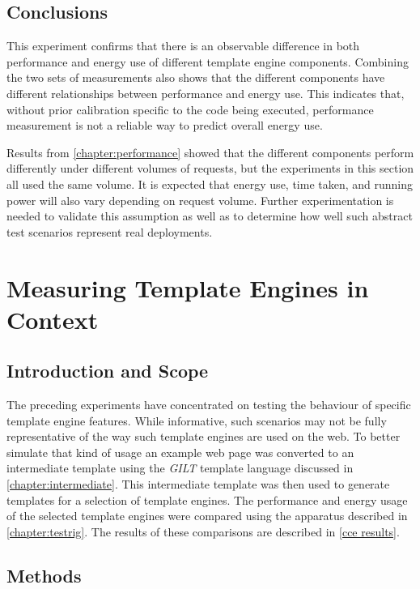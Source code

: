 \subsection{Conclusions}
\label{fse2 conclusions}

This experiment confirms that there is an observable difference in both performance and energy use of different template engine components. Combining the two sets of measurements also shows that the different components have different relationships between performance and energy use. This indicates that, without prior calibration specific to the code being executed, performance measurement is not a reliable way to predict overall energy use.

Results from \autoref{chapter:performance} showed that the different components perform differently under different volumes of requests, but the experiments in this section all used the same volume. It is expected that energy use, time taken, and running power will also vary depending on request volume.  Further experimentation is needed to validate this assumption as well as to determine how well such abstract test scenarios represent real deployments.

\section{Measuring Template Engines in Context}
\label{section:context energy}

\subsection{Introduction and Scope}
\label{cce intro}

The preceding experiments have concentrated on testing the behaviour of specific template engine features. While informative, such scenarios may not be fully representative of the way such template engines are used on the web. To better simulate that kind of usage an example web page was converted to an intermediate template using the \emph{GILT} template language discussed in \autoref{chapter:intermediate}. This intermediate template was then used to generate templates for a selection of template engines. The performance and energy usage of the selected template engines were compared using the apparatus described in \autoref{chapter:testrig}. The results of these comparisons are described in \autoref{cce results}.

\subsection{Methods}


